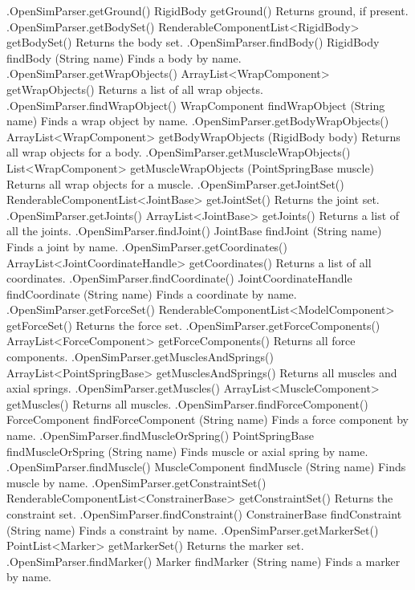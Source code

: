 %
\begin{methodtable}{0.65}{0.35}
\midline
%
\methodentry
{\osim.OpenSimParser.getGround()}%
{RigidBody getGround()}%
{Returns ground, if present.}%
%
\methodentry
{\osim.OpenSimParser.getBodySet()}%
{RenderableComponentList<RigidBody> getBodySet()}%
{Returns the body set.}%
%
\methodentry
{\osim.OpenSimParser.findBody()}%
{RigidBody findBody (String name)}%
{Finds a body by name.}%
%
\methodspace{0.5em}%
\methodentry
{\osim.OpenSimParser.getWrapObjects()}%
{ArrayList<WrapComponent> getWrapObjects() }%
{Returns a list of all wrap objects.}%
%
\methodentry
{\osim.OpenSimParser.findWrapObject()}%
{WrapComponent findWrapObject (String name) }%
{Finds a wrap object by name.}%
%
\methodentry
{\osim.OpenSimParser.getBodyWrapObjects()}%
{ArrayList<WrapComponent> getBodyWrapObjects (RigidBody body)}%
{Returns all wrap objects for a body.}%
%
\methodentry
{\osim.OpenSimParser.getMuscleWrapObjects()}%
{List<WrapComponent> getMuscleWrapObjects (\brh PointSpringBase muscle)}%
{Returns all wrap objects for a muscle.}%
%
\methodspace{0.5em}%
\methodentry
{\osim.OpenSimParser.getJointSet()}%
{RenderableComponentList<JointBase> getJointSet()}%
{Returns the joint set.}%
%
\methodentry
{\osim.OpenSimParser.getJoints()}%
{ArrayList<JointBase> getJoints()}%
{Returns a list of all the joints.}%
%
\methodentry
{\osim.OpenSimParser.findJoint()}%
{JointBase findJoint (String name)}%
{Finds a joint by name.}%
%
\methodentry
{\osim.OpenSimParser.getCoordinates()}%
{ArrayList<JointCoordinateHandle> getCoordinates()}%
{Returns a list of all coordinates.}%
\methodentry
{\osim.OpenSimParser.findCoordinate()}%
{JointCoordinateHandle findCoordinate (String name)}%
{Finds a coordinate by name.}%
%
\methodspace{0.5em}%
\methodentry
{\osim.OpenSimParser.getForceSet()}%
{RenderableComponentList<ModelComponent> getForceSet()}%
{Returns the force set.}%
\methodentry
{\osim.OpenSimParser.getForceComponents()}%
{ArrayList<ForceComponent> getForceComponents()}%
{Returns all force components.}%
%
\methodentry
{\osim.OpenSimParser.getMusclesAndSprings()}%
{ArrayList<PointSpringBase> getMusclesAndSprings()}%
{Returns all muscles and axial springs.}%
%
\methodentry
{\osim.OpenSimParser.getMuscles()}%
{ArrayList<MuscleComponent> getMuscles()}%
{Returns all muscles.}%
%
\methodentry
{\osim.OpenSimParser.findForceComponent()}%
{ForceComponent findForceComponent (String name)}%
{Finds a force component by name.}%
%
\methodentry
{\osim.OpenSimParser.findMuscleOrSpring()}%
{PointSpringBase findMuscleOrSpring (String name)}%
{Finds muscle or axial spring by name.}%
%
\methodentry
{\osim.OpenSimParser.findMuscle()}%
{MuscleComponent findMuscle (String name)}%
{Finds muscle by name.}%
%
\methodspace{0.5em}%
\methodentry
{\osim.OpenSimParser.getConstraintSet()}%
{RenderableComponentList<ConstrainerBase> getConstraintSet()}%
{Returns the constraint set.}%
%
\methodentry
{\osim.OpenSimParser.findConstraint()}%
{ConstrainerBase findConstraint (String name)}%
{Finds a constraint by name.}%
%
\methodspace{0.5em}%
\methodentry
{\osim.OpenSimParser.getMarkerSet()}%
{PointList<Marker> getMarkerSet()}%
{Returns the marker set.}%
%
\methodentry
{\osim.OpenSimParser.findMarker()}%
{Marker findMarker (String name)}%
{Finds a marker by name.}%
%
%
\midline
\end{methodtable}
